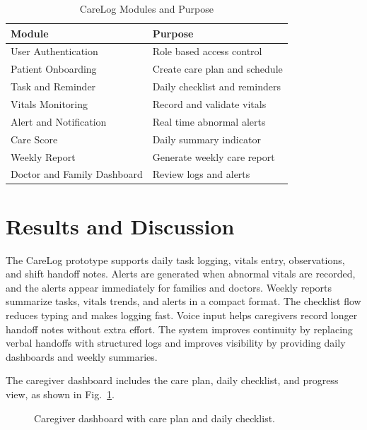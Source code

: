 \documentclass[conference]{IEEEtran}
\begin{document}
\begin{table}[htbp]
\caption{CareLog Modules and Purpose}
\begin{center}
\begin{tabular}{|p{3.5cm}|p{4.2cm}|}
\hline
\textbf{Module} & \textbf{Purpose} \\
\hline
User Authentication & Role based access control \\
Patient Onboarding & Create care plan and schedule \\
Task and Reminder & Daily checklist and reminders \\
Vitals Monitoring & Record and validate vitals \\
Alert and Notification & Real time abnormal alerts \\
Care Score & Daily summary indicator \\
Weekly Report & Generate weekly care report \\
Doctor and Family Dashboard & Review logs and alerts \\
\hline
\end{tabular}
\label{tab:modules}
\end{center}
\end{table}

\section{Results and Discussion}
The CareLog prototype supports daily task logging, vitals entry, observations, and shift handoff notes. Alerts are generated when abnormal vitals are recorded, and the alerts appear immediately for families and doctors. Weekly reports summarize tasks, vitals trends, and alerts in a compact format. The checklist flow reduces typing and makes logging fast. Voice input helps caregivers record longer handoff notes without extra effort. The system improves continuity by replacing verbal handoffs with structured logs and improves visibility by providing daily dashboards and weekly summaries.

The caregiver dashboard includes the care plan, daily checklist, and progress view, as shown in Fig.~\ref{fig:dashboard}.

\begin{figure}[htbp]
\centering
{}
\caption{Caregiver dashboard with care plan and daily checklist.}
\label{fig:dashboard}
\end{figure}
\end{document}
